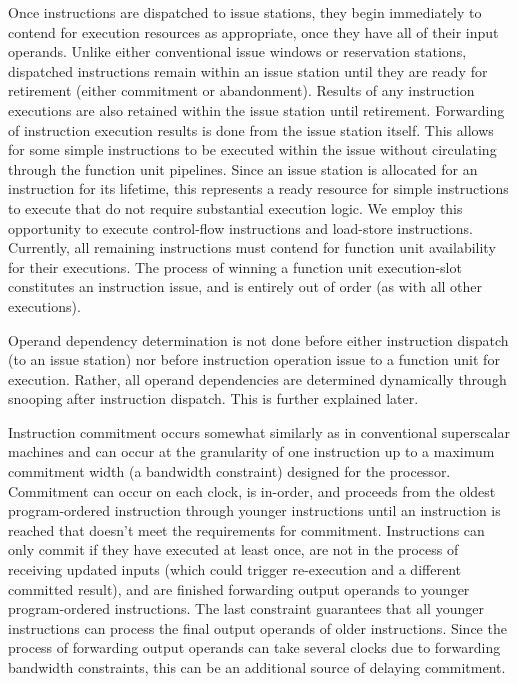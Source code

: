 \documentclass[10pt,dvips]{article}
\begin{document}
Once instructions are dispatched to issue stations,
they begin immediately to contend for execution resources
as appropriate,
once they have all of their input operands.
Unlike either conventional issue windows or reservation stations,
dispatched instructions remain within an issue station until they are
ready for retirement (either commitment or abandonment).
Results of any instruction executions are also retained within
the issue station until retirement.  
Forwarding of instruction execution
results is done from the issue station itself.
This allows for some simple instructions to be executed within
the issue without circulating through the function unit
pipelines.  Since an issue station is allocated for an instruction for
its lifetime, this represents a ready resource for simple
instructions to execute that do not require substantial
execution logic.  We employ this opportunity to execute
control-flow instructions and load-store instructions.
Currently, all remaining instructions must contend for 
function unit availability for their executions.
The process of winning a function unit execution-slot constitutes
an instruction issue, and is entirely out of order (as with
all other executions).

Operand dependency determination is not done before
either instruction dispatch (to an issue station) nor
before instruction operation issue to a function unit for
execution.
Rather, all operand dependencies are determined dynamically through
snooping after instruction dispatch.
This is further explained later.

Instruction commitment occurs somewhat similarly as in
conventional superscalar machines and can occur at the
granularity of one instruction up to a maximum commitment
width (a bandwidth constraint) designed for the processor.
Commitment can occur on each clock, is in-order, and
proceeds from the oldest program-ordered
instruction through younger instructions until an instruction
is reached that doesn't meet the requirements for commitment.
Instructions can only commit if they have executed at least once,
are not in the process of receiving updated inputs (which could
trigger re-execution and a different committed result),
and are finished forwarding output operands 
to younger program-ordered instructions.  
The last constraint guarantees that all younger
instructions can process the final output operands of older
instructions.
Since the process of forwarding output operands can take several
clocks due to forwarding bandwidth constraints, this can be
an additional source of delaying commitment.
\end{document}
